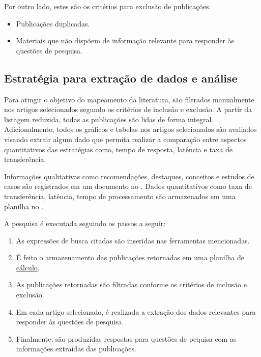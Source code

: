 Por outro lado, estes são os critérios para exclusão de publicações.
\label{section:criterios_exclusao}
\begin{itemize}
    \item Publicações duplicadas.
    \item Materiais que não dispõem de informação relevante para responder às questões de pesquisa.
\end{itemize}

\subsection{Estratégia para extração de dados e análise}
Para atingir o objetivo do mapeamento da literatura, são filtrados manualmente nos artigos selecionados segundo os critérios de inclusão e exclusão. A partir da listagem reduzida, todas as publicações são lidas de forma integral.
Adicionalmente, todos os gráficos e tabelas nos artigos selecionados são avaliados visando extrair algum dado que permita realizar a comparação entre aspectos quantitativos das estratégias como, tempo de resposta, latência e taxa de transferência.

Informações qualitativas como recomendações, destaques, conceitos e estudos de casos são registrados em um documento no . Dados quantitativos como taxa de transferência, latência, tempo de processamento são armazenados em uma planilha no . 

A pesquisa é executada seguindo os passos a seguir:
\begin{enumerate}
    \item As expressões de busca citadas são inseridas nas ferramentas mencionadas.
    \item É feito o armazenamento das publicações retornadas em uma \href{https://docs.google.com/spreadsheets/d/1rtH8Jl1EHguqZ4Py2mgV3pab7IQzt72-Sv2S1jPzLsQ/edit?usp=sharing}{planilha de cálculo}.
    \item As publicações retornadas são filtradas conforme os critérios de inclusão e exclusão.
    \item Em cada artigo selecionado, é realizada a extração dos dados relevantes para responder às questões de pesquisa.
    \item Finalmente, são produzidas respostas para questões de pequisa com as informações extraídas das publicações.
\end{enumerate}

